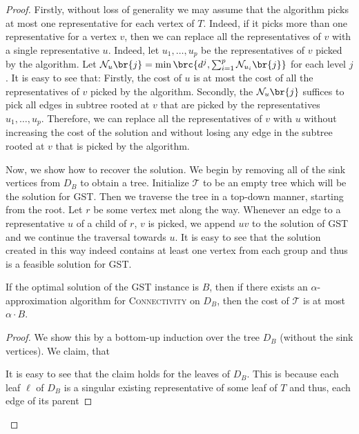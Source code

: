 \begin{proof}
    Firstly, without loss of generality we may assume that the algorithm picks at most one representative for each vertex of $T$. Indeed, if it picks more than one representative for a vertex $v$, then we can replace all the representatives of $v$ with a single representative $u$. Indeed, let $u_1,\dots, u_p$ be the representatives of $v$ picked by the algorithm. Let $\mathcal{N}_u\br{j}=\min\brc{d^j, \sum_{i=1}^{p} \mathcal{N}_{u_i}\br{j}}$ for each level $j$. It is easy to see that: Firstly, the cost of $u$ is at most the cost of all the representatives of $v$ picked by the algorithm. Secondly, the $\mathcal{N}_u\br{j}$ suffices to pick all edges in subtree rooted at $v$ that are picked by the representatives $u_1,\dots, u_p$. Therefore, we can replace all the representatives of $v$ with $u$ without increasing the cost of the solution and without losing any edge in the subtree rooted at $v$ that is picked by the algorithm.
        
    Now, we show how to recover the solution. We begin by removing all of the sink vertices from $D_B$ to obtain a tree. Initialize $\mathcal{T}$ to be an empty tree which will be the solution for \textsc{GST}. Then we traverse the tree in a top-down manner, starting from the root. Let $r$ be some vertex met along the way. Whenever an edge to a representative $u$ of a child of $r$, $v$ is picked, we append $uv$ to the solution of \textsc{GST} and we continue the traversal towards $u$. It is easy to see that the solution created in this way indeed contains at least one vertex from each group and thus is a feasible solution for \textsc{GST}. 
    \begin{lemma}
        If the optimal solution of the \textsc{GST} instance is $B$, then if there exists an $\alpha$-approximation algorithm for \textsc{Connectivity} on $D_B$, then the cost of $\mathcal{T}$ is at most $\alpha\cdot B$.
    \end{lemma}
    \begin{proof}
        We show this by a bottom-up induction over the tree $D_B$ (without the sink vertices). We claim, that 
        
        It is easy to see that the claim holds for the leaves of $D_B$. This is because each leaf $\ell$ of $D_B$ is a singular existing representative of some leaf of $T$ and thus, each edge of its parent 

    \end{proof}
\end{proof}
